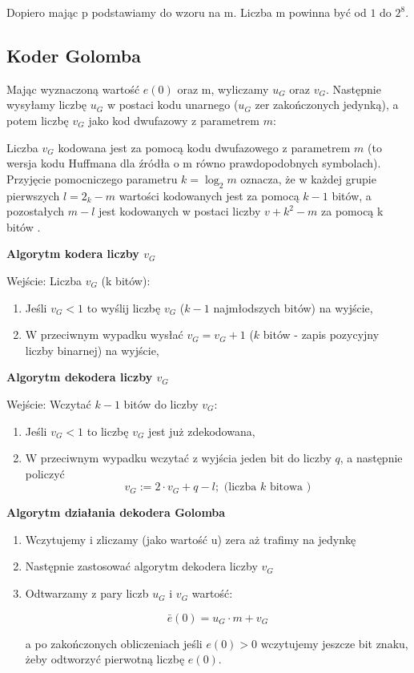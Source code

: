 \documentclass{article}
\begin{document}
Dopiero mając p podstawiamy do wzoru na m. Liczba m powinna być od $1$ do $2^8$.

\subsection{Koder Golomba}
\label{sec:golomb}

Mając wyznaczoną wartość $e(0)$ oraz m, wyliczamy $u_G$ oraz $v_G$. Następnie wysyłamy liczbę $u_G$ w postaci kodu unarnego ($u_G$ zer zakończonych jedynką), a potem liczbę $v_G$ jako kod dwufazowy z parametrem $m$:

Liczba $v_G$ kodowana jest za pomocą kodu dwufazowego z parametrem $m$ (to wersja kodu Huffmana dla źródła o m równo prawdopodobnych symbolach). Przyjęcie pomocniczego parametru $k = \log_2 m$ oznacza, że w każdej grupie pierwszych $l = 2_k - m$ wartości kodowanych jest za pomocą $k - 1$ bitów, a pozostałych $m-l$ jest kodowanych w postaci liczby $v + k^2 - m$ za pomocą k bitów \cite{golomb}.

\textbf{Algorytm kodera liczby $v_G$}

Wejście: Liczba $v_G$ (k bitów):

\begin{enumerate}
  \item Jeśli $v_G < 1$ to wyślij liczbę $v_G$ ($k-1$ najmłodszych bitów) na wyjście,
  \item W przeciwnym wypadku wysłać $v_G = v_G + 1$ ($k$ bitów - zapis pozycyjny liczby binarnej) na wyjście,
\end{enumerate}

\textbf{Algorytm dekodera liczby $v_G$}

Wejście: Wczytać $k - 1$ bitów do liczby $v_G$:

\begin{enumerate}
  \item Jeśli $v_G < 1$ to liczbę $v_G$ jest już zdekodowana,
  \item W przeciwnym wypadku wczytać z wyjścia jeden bit do liczby $q$, a następnie policzyć 
  \begin{equation}
  v_{G}:=2 \cdot v_{G}+q-l ; \text { (liczba } k \text { bitowa })
  \end{equation}
\end{enumerate}

\textbf{Algorytm działania dekodera Golomba}

\begin{enumerate}
  \item Wczytujemy i zliczamy (jako wartość u) zera aż trafimy na jedynkę
  \item Następnie zastosować algorytm dekodera liczby $v_G$
  \item Odtwarzamy z pary liczb $u_G$ i $v_G$ wartość:
  
  \begin{equation}
  \bar{e}(0)=u_{G} \cdot m+v_{G}
  \end{equation}
  
  a po zakończonych obliczeniach jeśli $e(0) > 0$ wczytujemy jeszcze bit znaku, żeby odtworzyć pierwotną liczbę $e(0)$.	
  
\end{enumerate}
\end{document}
